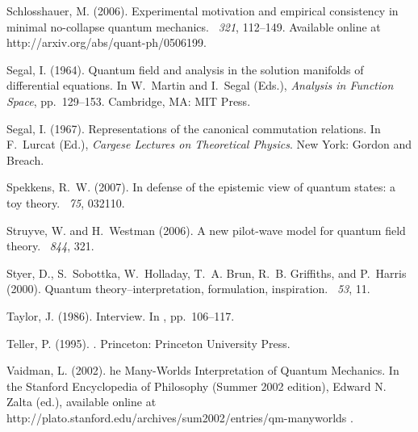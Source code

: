 \documentclass[12pt]{article}
\begin{document}
\begin{thebibliography}{}
Schlosshauer, M. (2006).
\newblock Experimental motivation and empirical consistency in minimal
  no-collapse quantum mechanics.
~{\em 321}, 112--149.
\newblock Available online at http://arxiv.org/abs/quant-ph/0506199.

Segal, I. (1964).
\newblock Quantum field and analysis in the solution manifolds of differential
  equations.
\newblock In W.~Martin and I.~Segal (Eds.), {\em Analysis in Function Space},
  pp.\  129--153. Cambridge, MA: MIT Press.

Segal, I. (1967).
\newblock Representations of the canonical commutation relations.
\newblock In F.~Lurcat (Ed.), {\em {C}argese Lectures on Theoretical Physics}.
  New York: Gordon and Breach.

Spekkens, R.~W. (2007).
\newblock In defense of the epistemic view of quantum states: a toy theory.
~{\em 75}, 032110.

Struyve, W. and H.~Westman (2006).
\newblock A new pilot-wave model for quantum field theory.
~{\em 844}, 321.

Styer, D., S.~Sobottka, W.~Holladay, T.~A. Brun, R.~B. Griffiths, and P.~Harris
  (2000).
\newblock Quantum theory--interpretation, formulation, inspiration.
~{\em 53}, 11.

Taylor, J. (1986).
\newblock Interview.
\newblock In , pp.\  106--117.

Teller, P. (1995).
.
\newblock Princeton: Princeton University Press.

Vaidman, L. (2002).
he {M}any-{W}orlds {I}nterpretation of {Q}uantum {M}echanics.
\newblock In the Stanford Encyclopedia of Philosophy (Summer 2002 edition),
  Edward N. Zalta (ed.), available online at
  http://plato.stanford.edu/archives/sum2002/entries/qm-manyworlds .


\end{thebibliography}
\end{document}
